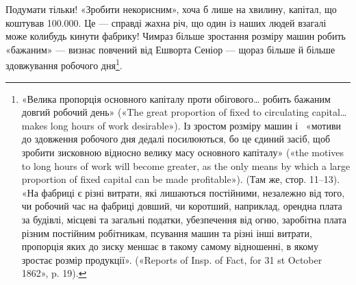 Подумати тільки! «Зробити некорисним», хоча б лише на хвилину,
капітал, що коштував \num{100.000}. Це — справді
жахна річ, що один із наших людей взагалі може колибудь кинути
фабрику! Чимраз більше зростання розміру машин робить «бажаним»
— визнає повчений від Ешворта Сеніор — щораз більше
й більше здовжування робочого дня\footnote{
«Велика пропорція основного капіталу проти обігового\dots{} робить
бажаним довгий робочий день» («The great proportion of fixed to circulating
capital\dots{} makes long hours of work desirable»). Із зростом розміру
машин і~ «мотиви до здовження робочого дня дедалі посилюються,
бо це єдиний засіб, щоб зробити зисковною відносно велику масу основного
капіталу» («the motives to long hours of work will become greater,
as the only means by which a large proportion of fixed capital can be
made profitable»). (Там же, стор. 11--13). «На фабриці є різні витрати,
які лишаються постійними, незалежно від того, чи робочий час на
фабриці довший, чи коротший, наприклад, орендна плата за будівлі, місцеві
та загальні податки, убезпечення від огню, заробітна плата різним
постійним робітникам, псування машин та різні інші витрати, пропорція
яких до зиску меншає в такому самому відношенні, в якому
зростає розмір продукції». («Reports of Insp. of Fact, for 31 st October
1862», p. 19).
}.
